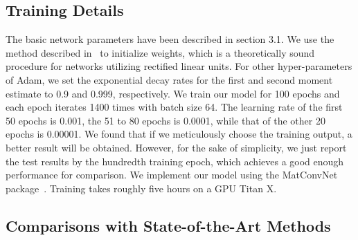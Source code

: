\documentclass[5pt]{article}
\begin{document}
\subsection{Training Details}

The basic network parameters have been described in section 3.1. We use the method described in~\cite{rf25} to initialize weights, which is a theoretically sound procedure for networks utilizing rectified linear units. For other hyper-parameters of Adam, we set the exponential decay rates for the first and second moment estimate to 0.9 and 0.999, respectively. We train our model for 100 epochs and each epoch iterates 1400 times with batch size 64. The learning rate of the first 50 epochs is 0.001, the 51 to 80 epochs is 0.0001, while that of the other 20 epochs is 0.00001. We found that if we meticulously choose the training output, a better result will be obtained. However, for the sake of simplicity, we just report the test results by the hundredth training epoch, which achieves a good enough performance for comparison. We implement our model using the MatConvNet package~\cite{rf26}. Training takes roughly five hours on a GPU Titan X.

\subsection{Comparisons with State-of-the-Art Methods}
\end{document}
